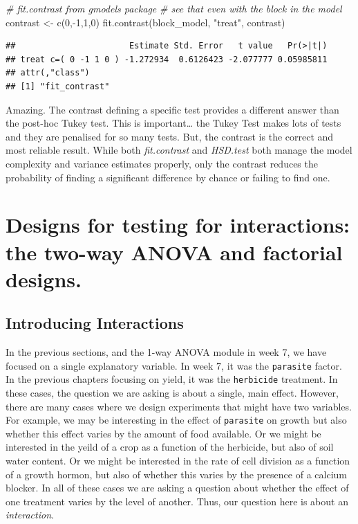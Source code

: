 \documentclass[
]{book}
\newenvironment{Shaded}{\begin{snugshade}}{\end{snugshade}}
\newcommand{\CommentTok}[1]{\textcolor[rgb]{0.56,0.35,0.01}{\textit{#1}}}
\newcommand{\DecValTok}[1]{\textcolor[rgb]{0.00,0.00,0.81}{#1}}
\newcommand{\FunctionTok}[1]{\textcolor[rgb]{0.00,0.00,0.00}{#1}}
\newcommand{\NormalTok}[1]{#1}
\newcommand{\OtherTok}[1]{\textcolor[rgb]{0.56,0.35,0.01}{#1}}
\newcommand{\SpecialCharTok}[1]{\textcolor[rgb]{0.00,0.00,0.00}{#1}}
\newcommand{\StringTok}[1]{\textcolor[rgb]{0.31,0.60,0.02}{#1}}
\begin{document}
\begin{Shaded}
\begin{Highlighting}[]
\CommentTok{\# fit.contrast from gmodels package}
\CommentTok{\# see that even with the block in the model}
\NormalTok{contrast }\OtherTok{\textless{}{-}} \FunctionTok{c}\NormalTok{(}\DecValTok{0}\NormalTok{,}\SpecialCharTok{{-}}\DecValTok{1}\NormalTok{,}\DecValTok{1}\NormalTok{,}\DecValTok{0}\NormalTok{)}
\FunctionTok{fit.contrast}\NormalTok{(block\_model, }\StringTok{"treat"}\NormalTok{, contrast)}
\end{Highlighting}
\end{Shaded}

\begin{verbatim}
##                       Estimate Std. Error   t value   Pr(>|t|)
## treat c=( 0 -1 1 0 ) -1.272934  0.6126423 -2.077777 0.05985811
## attr(,"class")
## [1] "fit_contrast"
\end{verbatim}

Amazing. The contrast defining a specific test provides a different answer than the post-hoc Tukey test. This is important\ldots{} the Tukey Test makes lots of tests and they are penalised for so many tests. But, the contrast is the correct and most reliable result. While both \emph{fit.contrast} and \emph{HSD.test} both manage the model complexity and variance estimates properly, only the contrast reduces the probability of finding a significant difference by chance or failing to find one.

\hypertarget{designs-for-testing-for-interactions-the-two-way-anova-and-factorial-designs.}{%
\chapter{Designs for testing for interactions: the two-way ANOVA and factorial designs.}\label{designs-for-testing-for-interactions-the-two-way-anova-and-factorial-designs.}}

\hypertarget{introducing-interactions}{%
\section{Introducing Interactions}\label{introducing-interactions}}

In the previous sections, and the 1-way ANOVA module in week 7, we have focused on a single explanatory variable. In week 7, it was the \texttt{parasite} factor. In the previous chapters focusing on yield, it was the \texttt{herbicide} treatment. In these cases, the question we are asking is about a single, main effect. However, there are many cases where we design experiments that might have two variables. For example, we may be interesting in the effect of \texttt{parasite} on growth but also whether this effect varies by the amount of food available. Or we might be interested in the yeild of a crop as a function of the herbicide, but also of soil water content. Or we might be interested in the rate of cell division as a function of a growth hormon, but also of whether this varies by the presence of a calcium blocker. In all of these cases we are asking a question about whether the effect of one treatment varies by the level of another. Thus, our question here is about an \emph{interaction}.
\end{document}
